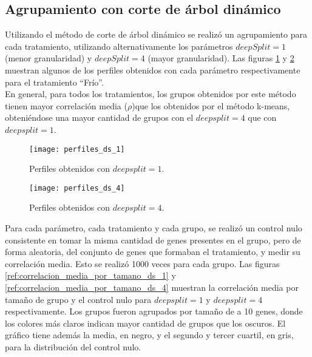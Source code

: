 \subsection{Agrupamiento con corte de árbol dinámico}
Utilizando el método de corte de árbol dinámico se realizó un agrupamiento para cada tratamiento, utilizando alternativamente los parámetros $deepSplit=1$ (menor granularidad) y $deepSplit=4$ (mayor granularidad). Las figuras \ref{fig:perfiles_ds_1} y \ref{fig:perfiles_ds_4} muestran algunos de los perfiles obtenidos con cada parámetro respectivamente para el tratamiento ``Frío''.\\ 
En general, para todos los tratamientos, los grupos obtenidos por este método tienen mayor correlación media ($\rho$)que los obtenidos por el método k-means, obteniéndose una mayor cantidad de grupos con el $deepsplit=4$ que con $deepsplit=1$.\\
\begin{figure*}[t!]
    \centering
    \begin{subfigure}[t]{0.45\textwidth}
    \centering
    \texttt{[image: perfiles\_ds\_1]}
    \caption{Perfiles obtenidos con $deepsplit=1$.}
    \label{fig:perfiles_ds_1}
    \end{subfigure}
    \begin{subfigure}[t]{0.45\textwidth}
    \centering
    \texttt{[image: perfiles\_ds\_4]}
    \caption{Perfiles obtenidos con $deepsplit=4$.}
    \label{fig:perfiles_ds_4}
    \end{subfigure}
    \caption{Perfiles de expresión génica obtenidos con el método corte de árbol dinámico para $deepsplit=1$ y $deepsplit=4$ para el tratamiento 'Frío'. En negro, el valor medio de cada grupo.}
\end{figure*}

Para cada parámetro, cada tratamiento y cada grupo, se realizó un control nulo consistente en tomar la misma cantidad de genes presentes en el grupo, pero de forma aleatoria, del conjunto de genes que formaban el tratamiento, y medir su correlación media. Esto se realizó 1000 veces para cada grupo. Las figuras \ref{ref:correlacion_media_por_tamano_ds_1} y \ref{ref:correlacion_media_por_tamano_ds_4} muestran la correlación media por tamaño de grupo y el control nulo para $deepsplit=1$ y $deepsplit=4$ respectivamente. Los grupos fueron agrupados por tamaño de a 10 genes, donde los colores más claros indican mayor cantidad de grupos que los oscuros. El gráfico tiene además la media, en negro, y el segundo y tercer cuartil, en gris, para la distribución del control nulo.

